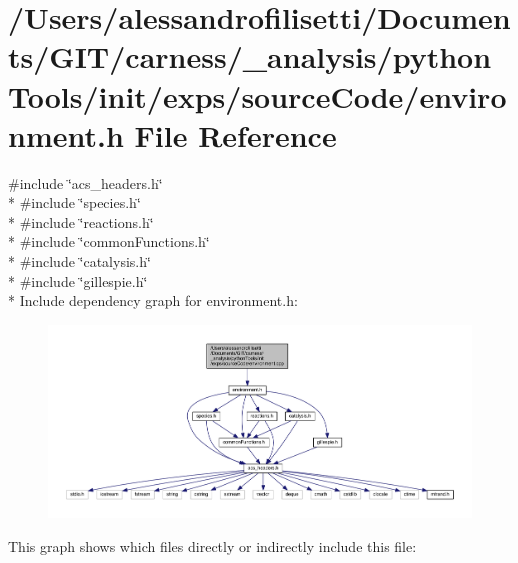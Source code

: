 \hypertarget{a00062}{\section{/\-Users/alessandrofilisetti/\-Documents/\-G\-I\-T/carness/\-\_\-analysis/python\-Tools/init/exps/source\-Code/environment.h File Reference}
\label{a00062}
}
{\ttfamily \#include \char`\"{}acs\-\_\-headers.\-h\char`\"{}}\\*
{\ttfamily \#include \char`\"{}species.\-h\char`\"{}}\\*
{\ttfamily \#include \char`\"{}reactions.\-h\char`\"{}}\\*
{\ttfamily \#include \char`\"{}common\-Functions.\-h\char`\"{}}\\*
{\ttfamily \#include \char`\"{}catalysis.\-h\char`\"{}}\\*
{\ttfamily \#include \char`\"{}gillespie.\-h\char`\"{}}\\*
Include dependency graph for environment.\-h\-:
\nopagebreak
\begin{figure}[H]
\begin{center}
\leavevmode
\includegraphics[width=350pt]{a00178}
\end{center}
\end{figure}
This graph shows which files directly or indirectly include this file\-:
\nopagebreak
